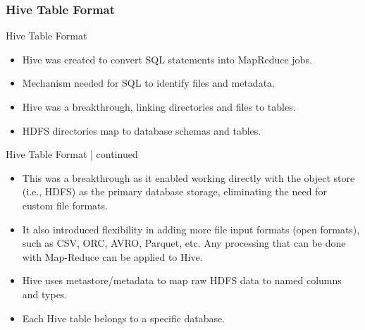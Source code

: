 \subsubsection{Hive Table Format}
\begin{frame}{Hive Table Format}

	\begin{itemize}
		\item Hive was created to convert SQL statements into MapReduce jobs.
		\item Mechanism needed for SQL to identify files and metadata.
		\item Hive was a breakthrough, linking directories and files to tables.
		\item HDFS directories map to database schemas and tables.

	
	\end{itemize}
	\end{frame}
\begin{frame}{Hive Table Format | continued}

	\begin{itemize}
		\item This was a breakthrough as it enabled working directly with the object store (i.e., HDFS) as the primary database storage, eliminating the need for custom file formats.
		\item It also introduced flexibility in adding more file input formats (open formats), such as CSV, ORC, AVRO, Parquet, etc. Any processing that can be done with Map-Reduce can be applied to Hive.
        \item Hive uses metastore/metadata to map raw HDFS data to named columns and types.
		\item Each Hive table belongs to a specific database.
	
	\end{itemize}
	\end{frame}

